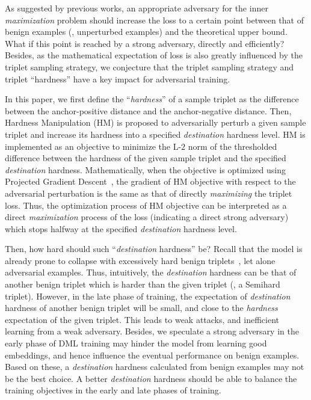 \documentclass[10pt,twocolumn,letterpaper]{article}
\begin{document}

As suggested by previous works, an appropriate adversary for the inner
\emph{maximization} problem should increase the loss to a certain point between
that of benign examples (\ie, unperturbed examples) and the theoretical upper
bound.
%
What if this point is reached by a strong adversary, directly and
efficiently?
%
Besides, as the mathematical expectation of loss is also greatly influenced by
the triplet sampling strategy, we conjecture that the triplet sampling strategy
and triplet ``hardness'' have a key impact for adversarial training.


In this paper, we first define the ``\emph{hardness}'' of a sample triplet as
the difference between the anchor-positive distance and the anchor-negative
distance.
%
Then, Hardness Manipulation (HM) is proposed to adversarially perturb a given
sample triplet and increase its hardness into a specified \emph{destination}
hardness level.
%
HM is implemented as an objective to minimize the L-$2$ norm of the thresholded
difference between the hardness of the given sample triplet and the specified
\emph{destination} hardness.
%
Mathematically, when the objective is optimized using Projected Gradient
Descent~\cite{madry}, the gradient of HM objective with respect to the
adversarial perturbation is the same as that of directly \emph{maximizing} the
triplet loss.
%
Thus, the optimization process of HM objective can be interpreted as a direct
\emph{maximization} process of the loss (indicating a direct strong adversary)
which stops halfway at the specified \emph{destination} hardness level.



Then, how hard should such ``\emph{destination} hardness'' be?
%
Recall that the model is already prone to collapse with excessively hard benign
triplets~\cite{facenet}, let alone adversarial examples.
%
Thus, intuitively, the \emph{destination} hardness can be that of another
benign triplet which is harder than the given triplet (\eg, a
Semihard~\cite{facenet} triplet).
%
However, in the late phase of training, the
expectation of \emph{destination} hardness of another benign triplet
will be small, and close to the \emph{hardness} expectation of the given triplet.
%
This leads to weak attacks, and inefficient learning from a weak adversary.
%
Besides, we speculate a strong adversary in the early phase of DML training may
hinder the model from learning good embeddings, and hence influence the
eventual performance on benign examples.
%
Based on these, a \emph{destination} hardness calculated from benign examples
may not be the best choice.
%
A better \emph{destination} hardness should be able to balance the training
objectives in the early and late phases of training.
\end{document}
